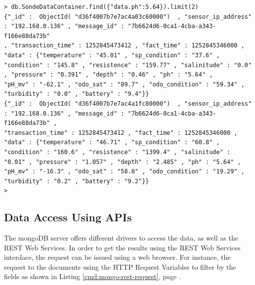 \lstset{label=cmd:mongo-find-limit,caption=Query Element with specific
projection limiting the result set size}
\begin{lstlisting}
> db.SondeDataContainer.find({"data.ph":5.64}).limit(2)
{"_id" :  ObjectId( "d36f4007b7e7ac4a03c60000")  , "sensor_ip_address" : "192.168.0.136" , "message_id" : "7b6624d6-0ca1-4cba-a343-f166e88da73b"
, "transaction_time" : 1252845473412 , "fact_time" : 1252845346000 , "data" : {"temperature" : "45.01" , "sp_condition" : "37.6" ,
"condition" : "145.8" , "resistence" : "159.77" , "salinitude" : "0.0" , "pressure" : "0.391" , "depth" : "0.46" , "ph" : "5.64" ,
"pH_mv" : "-62.1" , "odo_sat" : "89.7" , "odo_condition" : "59.34" , "turbidity" : "0.0" , "battery" : "9.4"}}
{"_id" :  ObjectId( "d36f4007b7e7ac4a1fc80000")  , "sensor_ip_address" : "192.168.0.136" , "message_id" : "7b6624d6-0ca1-4cba-a343-f166e88da73b" ,
"transaction_time" : 1252845473412 , "fact_time" : 1252845346000 , "data" : {"temperature" : "46.71" , "sp_condition" : "60.8" ,
"condition" : "160.6" , "resistence" : "1399.4" , "salinitude" : "0.01" , "pressure" : "1.057" , "depth" : "2.485" , "ph" : "5.64" ,
"pH_mv" : "-16.3" , "odo_sat" : "58.8" , "odo_condition" : "19.29" , "turbidity" : "0.2" , "battery" : "9.2"}}
>
\end{lstlisting}

\subsection{Data Access Using APIs}
\label{sec:dsp-mongodb-rest-ws}

The mongoDB server offers different drivers to access the data, as well as the
REST Web Services. In order to get the results using the REST Web Services
interdace, the request can be issued using a web browser. For instance, the
request to the documents using the HTTP Request Variables to filter by the
fields as shown in Listing \ref{cmd:mongo-rest-request}, page
\pageref{cmd:mongo-rest-request}.


